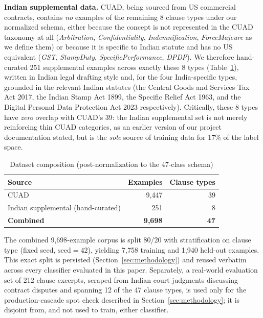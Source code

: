 \documentclass[conference]{IEEEtran}
\begin{document}
\textbf{Indian supplemental data.} CUAD, being sourced from US commercial contracts, contains \emph{no} examples of the remaining 8 clause types under our normalized schema, either because the concept is not represented in the CUAD taxonomy at all (\textit{Arbitration}, \textit{Confidentiality}, \textit{Indemnification}, \textit{ForceMajeure} as we define them) or because it is specific to Indian statute and has no US equivalent (\textit{GST}, \textit{StampDuty}, \textit{SpecificPerformance}, \textit{DPDP}). We therefore hand-curated 251 supplemental examples across exactly these 8 types (Table~\ref{tab:dataset}), written in Indian legal drafting style and, for the four India-specific types, grounded in the relevant Indian statutes (the Central Goods and Services Tax Act 2017, the Indian Stamp Act 1899, the Specific Relief Act 1963, and the Digital Personal Data Protection Act 2023 respectively). Critically, these 8 types have \emph{zero} overlap with CUAD's 39: the Indian supplemental set is not merely reinforcing thin CUAD categories, as an earlier version of our project documentation stated, but is the \emph{sole} source of training data for 17\% of the label space.

\begin{table}[t]
\caption{Dataset composition (post-normalization to the 47-class schema)}
\label{tab:dataset}
\centering
\begin{tabular}{@{}lrr@{}}
\toprule
Source & Examples & Clause types \\
\midrule
CUAD~\cite{cuad2021} & 9{,}447 & 39 \\
Indian supplemental (hand-curated) & 251 & 8 \\
\midrule
\textbf{Combined} & \textbf{9{,}698} & \textbf{47} \\
\bottomrule
\end{tabular}
\end{table}

The combined 9{,}698-example corpus is split 80/20 with stratification on clause type (fixed seed, $\mathrm{seed}=42$), yielding 7{,}758 training and 1{,}940 held-out examples. This exact split is persisted (Section~\ref{sec:methodology}) and reused verbatim across every classifier evaluated in this paper. Separately, a real-world evaluation set of 212 clause excerpts, scraped from Indian court judgments discussing contract disputes and spanning 12 of the 47 clause types, is used only for the production-cascade spot check described in Section~\ref{sec:methodology}; it is disjoint from, and not used to train, either classifier.
\end{document}
